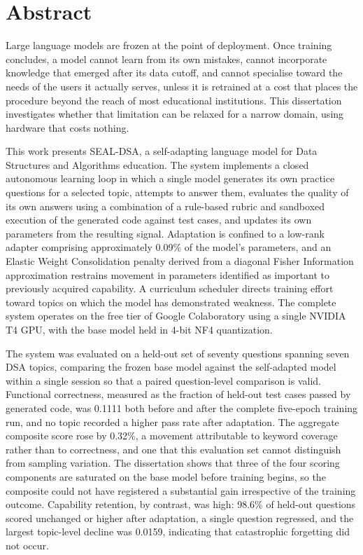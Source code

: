 \documentclass[12pt,a4paper]{report}
\begin{document}
\clearpage

\chapter*{Abstract}

Large language models are frozen at the point of deployment. Once training concludes, a model cannot learn from its own mistakes, cannot incorporate knowledge that emerged after its data cutoff, and cannot specialise toward the needs of the users it actually serves, unless it is retrained at a cost that places the procedure beyond the reach of most educational institutions. This dissertation investigates whether that limitation can be relaxed for a narrow domain, using hardware that costs nothing.

This work presents SEAL-DSA, a self-adapting language model for Data Structures and Algorithms education. The system implements a closed autonomous learning loop in which a single model generates its own practice questions for a selected topic, attempts to answer them, evaluates the quality of its own answers using a combination of a rule-based rubric and sandboxed execution of the generated code against test cases, and updates its own parameters from the resulting signal. Adaptation is confined to a low-rank adapter comprising approximately 0.09\% of the model's parameters, and an Elastic Weight Consolidation penalty derived from a diagonal Fisher Information approximation restrains movement in parameters identified as important to previously acquired capability. A curriculum scheduler directs training effort toward topics on which the model has demonstrated weakness. The complete system operates on the free tier of Google Colaboratory using a single NVIDIA T4 GPU, with the base model held in 4-bit NF4 quantization.

The system was evaluated on a held-out set of seventy questions spanning seven DSA topics, comparing the frozen base model against the self-adapted model within a single session so that a paired question-level comparison is valid. Functional correctness, measured as the fraction of held-out test cases passed by generated code, was 0.1111 both before and after the complete five-epoch training run, and no topic recorded a higher pass rate after adaptation. The aggregate composite score rose by 0.32\%, a movement attributable to keyword coverage rather than to correctness, and one that this evaluation set cannot distinguish from sampling variation. The dissertation shows that three of the four scoring components are saturated on the base model before training begins, so the composite could not have registered a substantial gain irrespective of the training outcome. Capability retention, by contrast, was high: 98.6\% of held-out questions scored unchanged or higher after adaptation, a single question regressed, and the largest topic-level decline was 0.0159, indicating that catastrophic forgetting did not occur.
\end{document}
